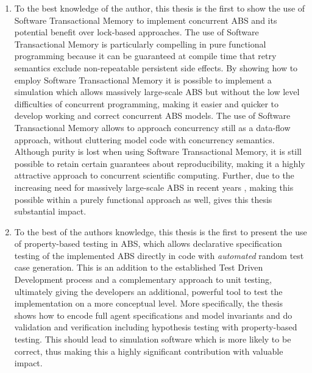 \begin{enumerate}
	\item To the best knowledge of the author, this thesis is the first to show the use of Software Transactional Memory to implement concurrent ABS and its potential benefit over lock-based approaches. The use of Software Transactional Memory is particularly compelling in pure functional programming because it can be guaranteed at compile time that retry semantics exclude non-repeatable persistent side effects. By showing how to employ Software Transactional Memory it is possible to implement a simulation which allows massively large-scale ABS but without the low level difficulties of concurrent programming, making it easier and quicker to develop working and correct concurrent ABS models. The use of Software Transactional Memory allows to approach concurrency still as a data-flow approach, without cluttering model code with concurrency semantics. Although purity is lost when using Software Transactional Memory, it is still possible to retain certain guarantees about reproducibility, making it a highly attractive approach to concurrent scientific computing. Further, due to the increasing need for massively large-scale ABS in recent years \cite{lysenko_framework_2008}, making this possible within a purely functional approach as well, gives this thesis substantial impact.
	
	\item To the best of the authors knowledge, this thesis is the first to present the use of property-based testing in ABS, which allows declarative specification testing of the implemented ABS directly in code with \textit{automated} random test case generation. This is an addition to the established Test Driven Development process and a complementary approach to unit testing, ultimately giving the developers an additional, powerful tool to test the implementation on a more conceptual level. More specifically, the thesis shows how to encode full agent specifications and model invariants and do validation and verification including hypothesis testing with property-based testing. This should lead to simulation software which is more likely to be correct, thus making this a highly significant contribution with valuable impact.

\end{enumerate}

